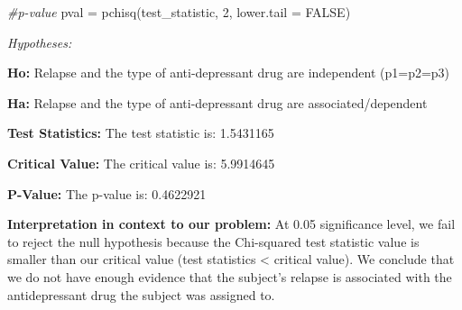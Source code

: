 \documentclass[
]{article}
\newenvironment{Shaded}{\begin{snugshade}}{\end{snugshade}}
\newcommand{\AttributeTok}[1]{\textcolor[rgb]{0.77,0.63,0.00}{#1}}
\newcommand{\CommentTok}[1]{\textcolor[rgb]{0.56,0.35,0.01}{\textit{#1}}}
\newcommand{\ConstantTok}[1]{\textcolor[rgb]{0.00,0.00,0.00}{#1}}
\newcommand{\DecValTok}[1]{\textcolor[rgb]{0.00,0.00,0.81}{#1}}
\newcommand{\FunctionTok}[1]{\textcolor[rgb]{0.00,0.00,0.00}{#1}}
\newcommand{\NormalTok}[1]{#1}
\newcommand{\OtherTok}[1]{\textcolor[rgb]{0.56,0.35,0.01}{#1}}
\begin{document}
\begin{Shaded}
\begin{Highlighting}[]
\CommentTok{\#p{-}value}
\NormalTok{pval }\OtherTok{=} \FunctionTok{pchisq}\NormalTok{(test\_statistic, }\DecValTok{2}\NormalTok{, }\AttributeTok{lower.tail =} \ConstantTok{FALSE}\NormalTok{)}
\end{Highlighting}
\end{Shaded}

\emph{Hypotheses:}

\textbf{Ho:} Relapse and the type of anti-depressant drug are
independent (p1=p2=p3)

\textbf{Ha:} Relapse and the type of anti-depressant drug are
associated/dependent

\textbf{Test Statistics:} The test statistic is: 1.5431165

\textbf{Critical Value:} The critical value is: 5.9914645

\textbf{P-Value:} The p-value is: 0.4622921

\textbf{Interpretation in context to our problem:} At 0.05 significance
level, we fail to reject the null hypothesis because the Chi-squared
test statistic value is smaller than our critical value (test statistics
\textless{} critical value). We conclude that we do not have enough
evidence that the subject's relapse is associated with the
antidepressant drug the subject was assigned to.
\end{document}
